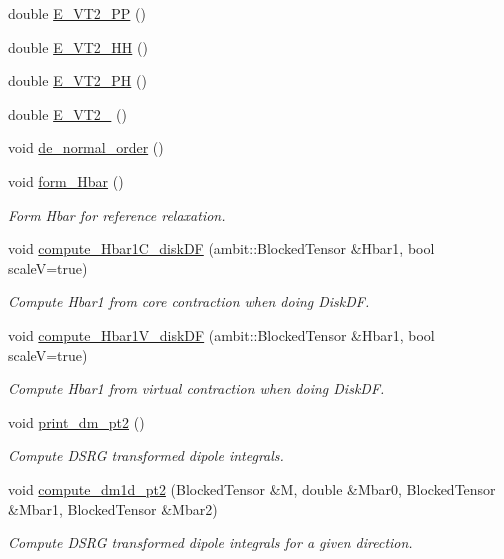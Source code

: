 \begin{DoxyCompactItemize}
\item 
double \mbox{\hyperlink{classforte_1_1_t_h_r_e_e___d_s_r_g___m_r_p_t2_a393848d10f0d33978444a1c15e024783}{E\+\_\+\+V\+T2\+\_\+PP}} ()
\item 
double \mbox{\hyperlink{classforte_1_1_t_h_r_e_e___d_s_r_g___m_r_p_t2_ab4624b5cce9103b64b4088de3f899514}{E\+\_\+\+V\+T2\+\_\+HH}} ()
\item 
double \mbox{\hyperlink{classforte_1_1_t_h_r_e_e___d_s_r_g___m_r_p_t2_ad5b1d7fdb2c787cff10de748dcb92f63}{E\+\_\+\+V\+T2\+\_\+PH}} ()
\item 
double \mbox{\hyperlink{classforte_1_1_t_h_r_e_e___d_s_r_g___m_r_p_t2_acc292f9f5362c7e5c85d4c58e1a52288}{E\+\_\+\+V\+T2\+\_}} ()
\item 
void \mbox{\hyperlink{classforte_1_1_t_h_r_e_e___d_s_r_g___m_r_p_t2_a281be0416b0e29a08ba0fcef0336dce6}{de\+\_\+normal\+\_\+order}} ()
\item 
void \mbox{\hyperlink{classforte_1_1_t_h_r_e_e___d_s_r_g___m_r_p_t2_a8550d58d35a914f8b5b930614d6ffb92}{form\+\_\+\+Hbar}} ()
\begin{DoxyCompactList}\small\item\em Form Hbar for reference relaxation. \end{DoxyCompactList}\item 
void \mbox{\hyperlink{classforte_1_1_t_h_r_e_e___d_s_r_g___m_r_p_t2_a5956eb7599f5dca20cfe7281f81795b5}{compute\+\_\+\+Hbar1\+C\+\_\+disk\+DF}} (ambit\+::\+Blocked\+Tensor \&Hbar1, bool scaleV=true)
\begin{DoxyCompactList}\small\item\em Compute Hbar1 from core contraction when doing Disk\+DF. \end{DoxyCompactList}\item 
void \mbox{\hyperlink{classforte_1_1_t_h_r_e_e___d_s_r_g___m_r_p_t2_a61efa7c20b24ea08e07267f5a54ae532}{compute\+\_\+\+Hbar1\+V\+\_\+disk\+DF}} (ambit\+::\+Blocked\+Tensor \&Hbar1, bool scaleV=true)
\begin{DoxyCompactList}\small\item\em Compute Hbar1 from virtual contraction when doing Disk\+DF. \end{DoxyCompactList}\item 
void \mbox{\hyperlink{classforte_1_1_t_h_r_e_e___d_s_r_g___m_r_p_t2_aaae87b4b8771a81827dab861c434b8ed}{print\+\_\+dm\+\_\+pt2}} ()
\begin{DoxyCompactList}\small\item\em Compute D\+S\+RG transformed dipole integrals. \end{DoxyCompactList}\item 
void \mbox{\hyperlink{classforte_1_1_t_h_r_e_e___d_s_r_g___m_r_p_t2_a0a73655f2f827169cce1c254950b9e8f}{compute\+\_\+dm1d\+\_\+pt2}} (Blocked\+Tensor \&M, double \&Mbar0, Blocked\+Tensor \&Mbar1, Blocked\+Tensor \&Mbar2)
\begin{DoxyCompactList}\small\item\em Compute D\+S\+RG transformed dipole integrals for a given direction. \end{DoxyCompactList}\end{DoxyCompactItemize}

